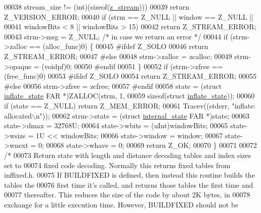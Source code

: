 \begin{DoxyCode}
00038         stream\_size != (\textcolor{keywordtype}{int})(\textcolor{keyword}{sizeof}(\hyperlink{structz__stream__s}{z\_stream})))
00039         \textcolor{keywordflow}{return} Z\_VERSION\_ERROR;
00040     \textcolor{keywordflow}{if} (strm == Z\_NULL || window == Z\_NULL ||
00041         windowBits < 8 || windowBits > 15)
00042         \textcolor{keywordflow}{return} Z\_STREAM\_ERROR;
00043     strm->msg = Z\_NULL;                 \textcolor{comment}{/* in case we return an error */}
00044     \textcolor{keywordflow}{if} (strm->zalloc == (alloc\_func)0) \{
00045 \textcolor{preprocessor}{#ifdef Z\_SOLO}
00046         \textcolor{keywordflow}{return} Z\_STREAM\_ERROR;
00047 \textcolor{preprocessor}{#else}
00048         strm->zalloc = zcalloc;
00049         strm->opaque = (voidpf)0;
00050 \textcolor{preprocessor}{#endif}
00051     \}
00052     \textcolor{keywordflow}{if} (strm->zfree == (free\_func)0)
00053 #ifdef Z\_SOLO
00054         \textcolor{keywordflow}{return} Z\_STREAM\_ERROR;
00055 \textcolor{preprocessor}{#else}
00056     strm->zfree = zcfree;
00057 \textcolor{preprocessor}{#endif}
00058     state = (\textcolor{keyword}{struct }\hyperlink{structinflate__state}{inflate\_state} FAR *)ZALLOC(strm, 1,
00059                                                \textcolor{keyword}{sizeof}(\textcolor{keyword}{struct} \hyperlink{structinflate__state}{inflate\_state}));
00060     \textcolor{keywordflow}{if} (state == Z\_NULL) \textcolor{keywordflow}{return} Z\_MEM\_ERROR;
00061     Tracev((stderr, \textcolor{stringliteral}{"inflate: allocated\(\backslash\)n"}));
00062     strm->state = (\textcolor{keyword}{struct }\hyperlink{structinternal__state}{internal\_state} FAR *)state;
00063     state->dmax = 32768U;
00064     state->wbits = (uInt)windowBits;
00065     state->wsize = 1U << windowBits;
00066     state->window = window;
00067     state->wnext = 0;
00068     state->whave = 0;
00069     \textcolor{keywordflow}{return} Z\_OK;
00070 \}
00071 
00072 \textcolor{comment}{/*}
00073 \textcolor{comment}{   Return state with length and distance decoding tables and index sizes set to}
00074 \textcolor{comment}{   fixed code decoding.  Normally this returns fixed tables from inffixed.h.}
00075 \textcolor{comment}{   If BUILDFIXED is defined, then instead this routine builds the tables the}
00076 \textcolor{comment}{   first time it's called, and returns those tables the first time and}
00077 \textcolor{comment}{   thereafter.  This reduces the size of the code by about 2K bytes, in}
00078 \textcolor{comment}{   exchange for a little execution time.  However, BUILDFIXED should not be}

\end{DoxyCode}
